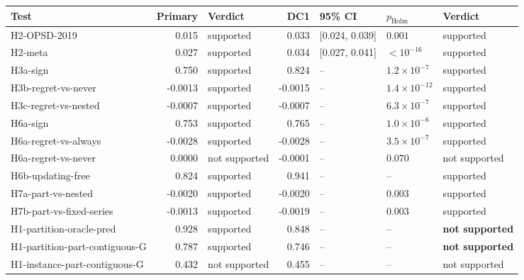 \begin{tabular}{@{}l r l r l l l@{}}\toprule
Test & Primary & Verdict & DC1 & 95\% CI & $p_{\mathrm{Holm}}$ & Verdict \\\midrule
H2-OPSD-2019 & 0.015 & supported & 0.033 & [0.024, 0.039] & $0.001$ & supported \\
H2-meta & 0.027 & supported & 0.034 & [0.027, 0.041] & $<10^{-16}$ & supported \\
H3a-sign & 0.750 & supported & 0.824 & -- & $1.2\times10^{-7}$ & supported \\
H3b-regret-vs-never & -0.0013 & supported & -0.0015 & -- & $1.4\times10^{-12}$ & supported \\
H3c-regret-vs-nested & -0.0007 & supported & -0.0007 & -- & $6.3\times10^{-7}$ & supported \\
H6a-sign & 0.753 & supported & 0.765 & -- & $1.0\times10^{-6}$ & supported \\
H6a-regret-vs-always & -0.0028 & supported & -0.0028 & -- & $3.5\times10^{-7}$ & supported \\
H6a-regret-vs-never & 0.0000 & not supported & -0.0001 & -- & $0.070$ & not supported \\
H6b-updating-free & 0.824 & supported & 0.941 & -- & -- & supported \\
H7a-part-vs-nested & -0.0020 & supported & -0.0020 & -- & $0.003$ & supported \\
H7b-part-vs-fixed-series & -0.0013 & supported & -0.0019 & -- & $0.003$ & supported \\
H1-partition-oracle-pred & 0.928 & supported & 0.848 & -- & -- & \textbf{not supported} \\
H1-partition-part-contiguous-G & 0.787 & supported & 0.746 & -- & -- & \textbf{not supported} \\
H1-instance-part-contiguous-G & 0.432 & not supported & 0.455 & -- & -- & not supported \\
\bottomrule\end{tabular}
